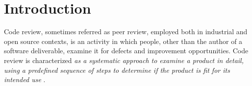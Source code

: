 \documentclass[ifip]{svmult}
\begin{document}



\section{Introduction}
\label{sec:1}

Code review, sometimes referred as peer review, employed both in industrial and open source contexts, 
is an activity in which people, other than the author of a software deliverable, 
examine it for defects and improvement opportunities.
Code review is characterized \textit{ as a systematic approach to examine a product in detail, 
using a predefined sequence of steps to determine if the product is fit for its intended use}
\cite{contribution14}.
\end{document}
